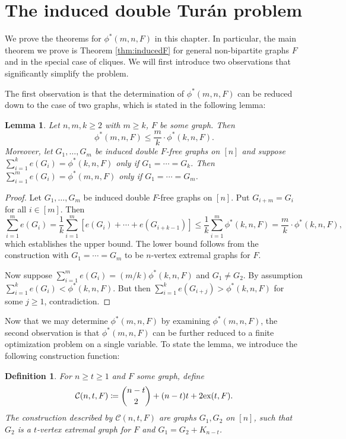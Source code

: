 \documentclass[12pt]{article}
\newtheorem{lemma}[theorem]{Lemma}
\newtheorem{definition}[theorem]{Definition}
\newcommand*{\ex}{\textnormal{ex}}
\newcommand*{\con}{\mathcal{C}}
\begin{document}
\section{The induced double Tur\'{a}n problem}

We prove the theorems for $\phi^*(m, n ,F)$ in this chapter. In particular, the main theorem we prove is Theorem \ref{thm:inducedF} for general non-bipartite graphs $F$ and in the special case of cliques. We will first introduce two observations that significantly simplify the problem.

The first observation is that the determination of $\phi^*(m, n, F)$ can be reduced down to the case of two graphs, which is stated in the following lemma:

\begin{lemma}\label{lem:induce-reduce}
  Let $n, m, k \geq 2$ with $m \geq k$, $F$ be some graph. Then
  \[
    \phi^*(m,n,F) \leq \frac{m}{k} \cdot \phi^*(k, n, F).
  \]
  Moreover, let $G_1, \ldots, G_m$ be induced double $F$-free graphs on $[n]$ and suppose $\sum_{i = 1}^k e(G_i) = \phi^*(k, n, F)$ only if $G_1 = \cdots = G_k$. Then $\sum_{i = 1}^m e(G_i) = \phi^*(m, n, F)$ only if $G_1 = \cdots = G_m$.
\end{lemma}

\begin{proof}
  Let $G_1, \ldots, G_m$ be induced double $F$-free graphs on $[n]$. Put $G_{i + m} = G_i$ for all $i \in [m]$. Then
  \[
    \sum_{i = 1}^m e(G_i) = \frac{1}{k}\sum_{i = 1}^m [e(G_i) + \cdots + e(G_{i + k - 1})] \leq \frac{1}{k}\sum_{i = 1}^m \phi^*(k, n, F) = \frac{m}{k} \cdot \phi^*(k, n, F),
  \]
  which establishes the upper bound. The lower bound follows from the construction with $G_1 = \cdots = G_m$ to be $n$-vertex extremal graphs for $F$.

  Now suppose $\sum_{i = 1}^m e(G_i) = (m/k)\phi^*(k, n, F)$ and $G_1 \neq G_2$. By assumption $\sum_{i = 1}^k e(G_i) < \phi^*(k, n, F)$. But then $\sum_{i = 1}^k e(G_{i + j}) > \phi^*(k, n, F)$ for some $j \geq 1$, contradiction. 
\end{proof}

Now that we may determine $\phi^*(m, n, F)$ by examining $\phi^*(m, n, F)$, the second observation is that $\phi^*(m, n, F)$ can be further reduced to a finite optimization problem on a single variable. To state the lemma, we introduce the following construction function: 

\begin{definition}
  For $n \geq t \geq 1$ and $F$ some graph, define 
  \[
    \con(n, t, F) \coloneq \binom{n - t}{2} + (n - t)t + 2\ex(t, F).
  \]
  The construction described by $\con(n, t, F)$ are graphs $G_1, G_2$ on $[n]$, such that $G_2$ is a $t$-vertex extremal graph for $F$ and $G_1 = G_2 + K_{n - t}$. 
\end{definition}
\end{document}
